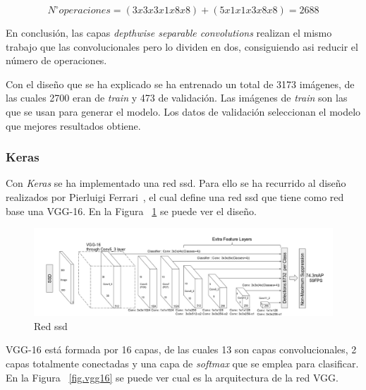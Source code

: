 \begin{equation}\label{mobilenet_formula}
N^{\circ} operaciones = (3x3x3x1x8x8) + (5x1x1x3x8x8) = 2688
\end{equation}

En conclusión, las capas \textit{depthwise separable convolutions} realizan el mismo trabajo que las convolucionales pero lo dividen en dos, consiguiendo asi reducir el número de operaciones.

Con el diseño que se ha explicado se ha entrenado un total de 3173 imágenes, de las cuales 2700 eran de \textit{train} y 473 de validación. Las imágenes de \textit{train} son las que se usan para generar el modelo. Los datos de validación seleccionan el modelo que mejores resultados obtiene.

 \subsubsection{Keras}
 
 Con \textit{Keras} se ha implementado una red \acrshort{ssd}. Para ello se ha recurrido al diseño realizados por Pierluigi Ferrari~\cite{ssd_ferrari}, el cual define una red \acrshort{ssd} que tiene como red base una VGG-16. En la Figura ~\ref{fig.ssd_300} se puede ver el diseño.
 
 \begin{figure}[H] 
\begin{center}
	\includegraphics[width=1.1\textwidth]{figures/Diseno_global/ssd300.png}
   \caption{Red \acrshort{ssd}}
	\label{fig.ssd_300}
\end{center}
\end{figure}

VGG-16  está formada por 16 capas, de las cuales 13 son capas convolucionales, 2 capas totalmente conectadas y una capa de \textit{softmax} que se emplea para clasificar. En la Figura ~\ref{fig.vgg16} se puede ver cual es la arquitectura de la red VGG.

